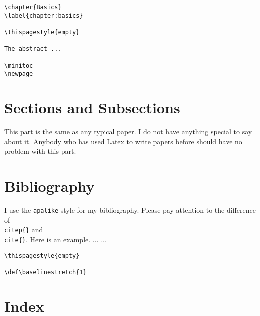 \begin{lstlisting}
\chapter{Basics}
\label{chapter:basics}

\thispagestyle{empty}

The abstract ...

\minitoc
\newpage
\end{lstlisting}



\section{Sections and Subsections} 

This part is the same as any typical paper. I do not have anything special
to say about it. Anybody who has used Latex to write papers before should have no problem with 
this part.




\section{Bibliography}

I use the \texttt{apalike} style for my bibliography. 
Please pay attention to the difference of \texttt{\\citep\{\}} and
\texttt{\\cite\{\}}. Here is an example.  
\cite{Saltzer74} ...
\citep{Saltzer74} ...

\begin{lstlisting}
\thispagestyle{empty}

\def\baselinestretch{1}

\end{lstlisting}



\section{Index}




